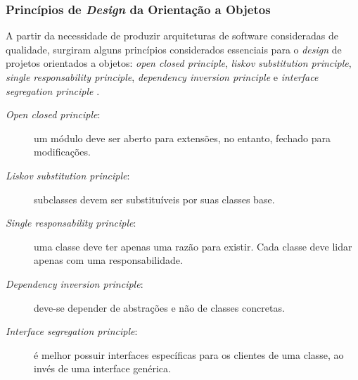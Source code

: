 \subsubsection{Princípios de \textit{Design} da Orientação a Objetos}
A partir da necessidade de produzir arquiteturas de software consideradas de
qualidade, surgiram alguns princípios considerados essenciais para o \textit{design}
de projetos orientados a objetos: \textit{open closed principle},
\textit{liskov substitution principle}, \textit{single responsability principle},
\textit{dependency inversion principle} e \textit{interface segregation principle}
\cite{martin2000}.
\begin{description}
\item[\textit{Open closed principle}:] um módulo deve ser aberto para extensões,
no entanto, fechado para modificações.
\item[\textit{Liskov substitution principle}:] subclasses devem ser substituíveis
por suas classes base.
\item[\textit{Single responsability principle}:] uma classe deve ter apenas uma
razão para existir. Cada classe deve lidar apenas com uma responsabilidade.
\item[\textit{Dependency inversion principle}:] deve-se depender de abstrações e
não de classes concretas.
\item[\textit{Interface segregation principle}:] é melhor possuir interfaces
específicas para os clientes de uma classe, ao invés de uma interface genérica.
\end{description}
\par
